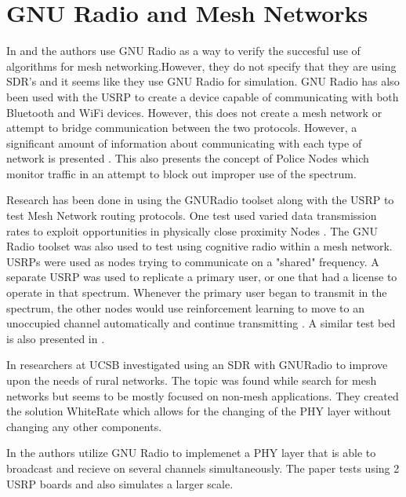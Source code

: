 \section{GNU Radio and Mesh Networks}

In \cite{4509617} and \cite{5062250} the authors use GNU Radio as a way to verify the succesful use of algorithms for mesh 
networking.However, they do not specify that they are using SDR's and it seems like they use GNU Radio for simulation. GNU Radio has
also been used with the USRP to create a device capable of communicating with both Bluetooth and WiFi devices. However, this does not
create a mesh network or attempt to bridge communication between the two protocols. However, a significant amount of information about
communicating with each type of network is presented \cite{4292880}. This also presents the concept of Police Nodes which monitor
traffic in an attempt to block out improper use of the spectrum. 

Research has been done in using the GNURadio toolset along with the USRP to test Mesh Network routing protocols. One test 
used varied data transmission rates to exploit opportunities in physically close proximity Nodes \cite{5462112}. The GNU Radio 
toolset was also used to test using cognitive radio within a mesh network. USRPs were used as nodes trying to communicate on a
"shared" frequency. A separate USRP was used to replicate a primary user, or one that had a license to operate in that spectrum. 
Whenever the primary user began to transmit in the spectrum, the other nodes would use reinforcement learning to move to an 
unoccupied channel automatically and continue transmitting \cite{7141228}. A similar test bed is also presented in \cite{5508221}.

In \cite{5984947} researchers at UCSB investigated using an SDR with GNURadio to
improve upon the needs of rural networks. The topic was found while search for mesh
networks but seems to be mostly focused on non-mesh applications. They created
the solution WhiteRate which allows for the changing of the PHY layer without 
changing any other components. 

In \cite{5462039} the authors utilize GNU Radio to implemenet a PHY layer that is 
able to broadcast and recieve on several channels simultaneously. The paper
tests using 2 USRP boards and also simulates a larger scale.  
